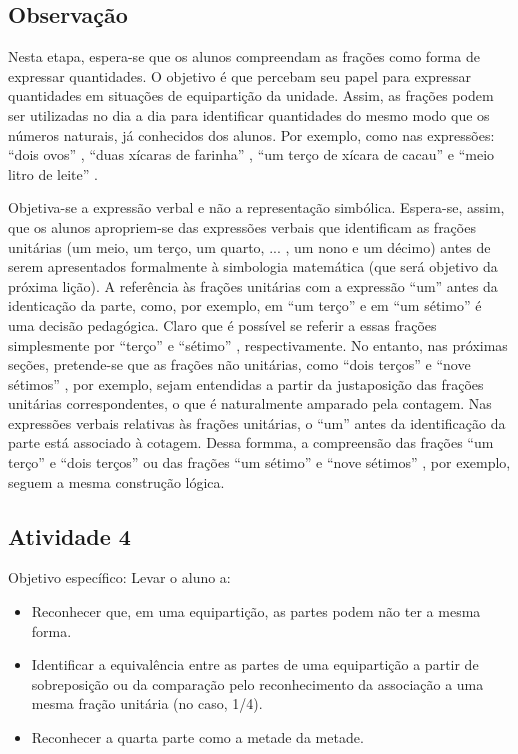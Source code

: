 \documentclass[oneside]{book}
\begin{document}
\begin{multicols}{2}
\subsection{Observação}

  Nesta etapa, espera-se que os alunos compreendam as frações como forma de expressar quantidades. O objetivo é que percebam seu papel para expressar quantidades em situações de equipartição da unidade. Assim, as frações podem ser utilizadas no dia a dia para identificar quantidades do mesmo modo que os números naturais, já conhecidos dos alunos. Por exemplo, como nas expressões:   ``dois ovos''  ,   ``duas xícaras de farinha''  ,   ``um terço de xícara de cacau''   e   ``meio litro de leite''  .

  Objetiva-se a expressão verbal e não a representação simbólica. Espera-se, assim, que os alunos apropriem-se das expressões verbais que identificam as frações unitárias (um meio, um terço, um quarto, ... , um nono e um décimo) antes de serem apresentados formalmente à simbologia matemática (que será objetivo da próxima lição).  A referência às frações unitárias com a expressão   ``um''   antes da identicação da parte, como, por exemplo, em   ``um terço''   e em   ``um sétimo''   é uma decisão pedagógica. Claro que é possível se referir a essas frações simplesmente por   ``terço''   e   ``sétimo''  , respectivamente. No entanto, nas próximas seções, pretende-se que as frações não unitárias, como   ``dois terços''   e   ``nove sétimos''  , por exemplo, sejam entendidas a partir da justaposição das frações unitárias correspondentes, o que é naturalmente amparado pela contagem. Nas expressões verbais relativas às frações unitárias, o   ``um''   antes da identificação da parte está associado à cotagem. Dessa formma, a compreensão das frações   ``um terço''   e   ``dois terços''   ou das frações   ``um sétimo''   e   ``nove sétimos''  , por exemplo, seguem a mesma construção lógica.


\subsection{Atividade 4}
  Objetivo específico: Levar o aluno a:
\begin{itemize} %
    \item       Reconhecer que, em uma equipartição, as partes podem não ter a mesma forma.
    \item       Identificar a equivalência entre as partes de uma equipartição a partir de sobreposição ou da comparação pelo reconhecimento da associação a uma mesma fração unitária (no caso, 1/4).
    \item       Reconhecer a quarta parte como a metade da metade.
\end{itemize} %



\end{multicols}
\end{document}
